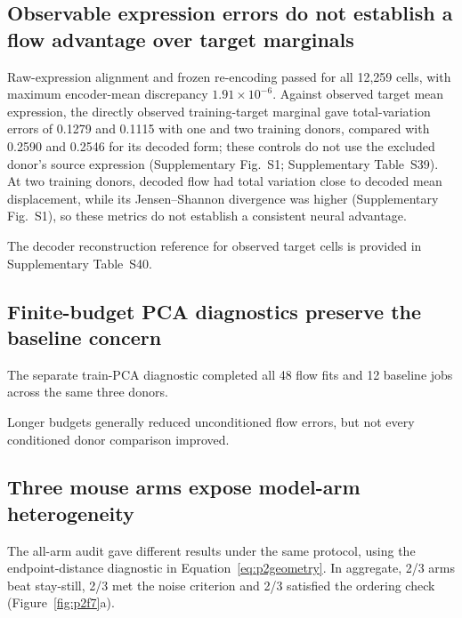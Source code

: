 \documentclass[10pt,a4paper]{article}
\begin{document}
\subsection{Observable expression errors do not establish a flow advantage over target marginals}

Raw-expression alignment and frozen re-encoding passed for all 12,259 cells, with maximum encoder-mean discrepancy $1.91\times10^{-6}$. Against observed target mean expression, the directly observed training-target marginal gave total-variation errors of 0.1279 and 0.1115 with one and two training donors, compared with 0.2590 and 0.2546 for its decoded form; these controls do not use the excluded donor's source expression (Supplementary Fig.~S1; Supplementary Table~S39). At two training donors, decoded flow had total variation close to decoded mean displacement, while its Jensen--Shannon divergence was higher (Supplementary Fig.~S1), so these metrics do not establish a consistent neural advantage.

The decoder reconstruction reference for observed target cells is provided in Supplementary Table~S40.

\subsection{Finite-budget PCA diagnostics preserve the baseline concern}

The separate train-PCA diagnostic completed all 48 flow fits and 12 baseline jobs across the same three donors.

Longer budgets generally reduced unconditioned flow errors, but not every conditioned donor comparison improved.

\subsection{Three mouse arms expose model-arm heterogeneity}

The all-arm audit gave different results under the same protocol, using the endpoint-distance diagnostic in Equation~\eqref{eq:p2geometry}. In aggregate, 2/3 arms beat stay-still, 2/3 met the noise criterion and 2/3 satisfied the ordering check (Figure~\ref{fig:p2f7}a\label{call:p2f7}).
\end{document}
